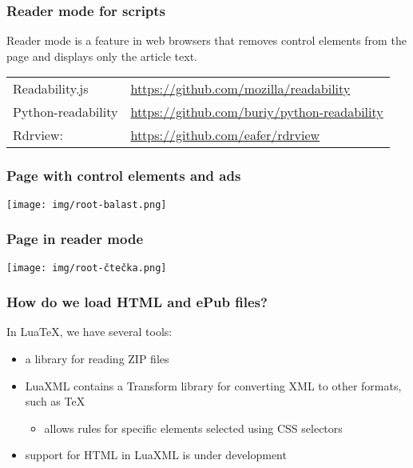 \begin{frame}
  \frametitle{Reader mode for scripts}
  Reader mode is a feature in web browsers that removes control elements from the page and displays only the article text.

  \bigskip

  \begin{tabular}{ll}
    Readability.js & \url{https://github.com/mozilla/readability}\\
    Python-readability & \url{https://github.com/buriy/python-readability}\\
    Rdrview: & \url{https://github.com/eafer/rdrview}\\
  \end{tabular}

\end{frame}

\begin{frame}
  \frametitle{Page with control elements and ads}
  \begin{center}
    \texttt{[image: img/root-balast.png]}
  \end{center}
\end{frame}

\begin{frame}
  \frametitle{Page in reader mode}
  \begin{center}
    \texttt{[image: img/root-čtečka.png]}
  \end{center}
\end{frame}

\begin{frame}
  \frametitle{How do we load HTML and ePub files?}
  In Lua\TeX, we have several tools:
  \begin{itemize}
    \item a library for reading ZIP files
    \item LuaXML contains a Transform library for converting XML to other formats, such as \TeX
      \begin{itemize}
        \item allows rules for specific elements selected using CSS selectors
      \end{itemize}
    \item support for HTML in LuaXML is under development
  \end{itemize}
\end{frame}

